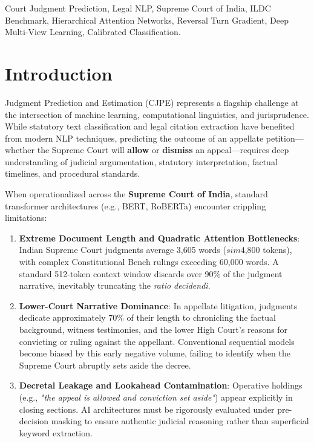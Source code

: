 \documentclass[journal,10pt,twocolumn]{IEEEtran}
\begin{document}
\begin{IEEEkeywords}
Court Judgment Prediction, Legal NLP, Supreme Court of India, ILDC Benchmark, Hierarchical Attention Networks, Reversal Turn Gradient, Deep Multi-View Learning, Calibrated Classification.
\end{IEEEkeywords}

\section{Introduction}
 Judgment Prediction and Estimation (CJPE) represents a flagship challenge at the intersection of machine learning, computational linguistics, and jurisprudence. While statutory text classification and legal citation extraction have benefited from modern NLP techniques, predicting the outcome of an appellate petition—whether the Supreme Court will \textbf{allow} or \textbf{dismiss} an appeal—requires deep understanding of judicial argumentation, statutory interpretation, factual timelines, and procedural standards.

When operationalized across the \textbf{Supreme Court of India}, standard transformer architectures (e.g., BERT, RoBERTa) encounter crippling limitations:
\begin{enumerate}
    \item \textbf{Extreme Document Length and Quadratic Attention Bottlenecks}: Indian Supreme Court judgments average 3,605 words ($sim$4,800 tokens), with complex Constitutional Bench rulings exceeding 60,000 words. A standard 512-token context window discards over 90\% of the judgment narrative, inevitably truncating the \textit{ratio decidendi}.
    \item \textbf{Lower-Court Narrative Dominance}: In appellate litigation, judgments dedicate approximately 70\% of their length to chronicling the factual background, witness testimonies, and the lower High Court's reasons for convicting or ruling against the appellant. Conventional sequential models become biased by this early negative volume, failing to identify when the Supreme Court abruptly sets aside the decree.
    \item \textbf{Decretal Leakage and Lookahead Contamination}: Operative holdings (e.g., \textit{"the appeal is allowed and conviction set aside"}) appear explicitly in closing sections. AI architectures must be rigorously evaluated under pre-decision masking to ensure authentic judicial reasoning rather than superficial keyword extraction.
\end{enumerate}
\end{document}

